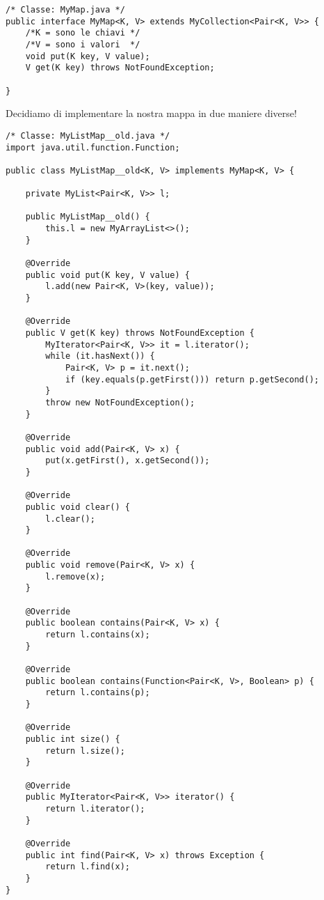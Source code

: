 \begin{lstlisting}[basicstyle=\small,]
/* Classe: MyMap.java */
public interface MyMap<K, V> extends MyCollection<Pair<K, V>> {
	/*K = sono le chiavi */
	/*V = sono i valori  */
    void put(K key, V value);
    V get(K key) throws NotFoundException;

}
\end{lstlisting}

\noindent Decidiamo di implementare la nostra mappa in due maniere diverse! 

\begin{lstlisting}[basicstyle=\small,]
/* Classe: MyListMap__old.java */
import java.util.function.Function;

public class MyListMap__old<K, V> implements MyMap<K, V> {

    private MyList<Pair<K, V>> l;

    public MyListMap__old() {
        this.l = new MyArrayList<>();
    }

    @Override
    public void put(K key, V value) {
        l.add(new Pair<K, V>(key, value));
    }

    @Override
    public V get(K key) throws NotFoundException {
        MyIterator<Pair<K, V>> it = l.iterator();
        while (it.hasNext()) {
            Pair<K, V> p = it.next();
            if (key.equals(p.getFirst())) return p.getSecond();
        }
        throw new NotFoundException();
    }

    @Override
    public void add(Pair<K, V> x) {
        put(x.getFirst(), x.getSecond());
    }

    @Override
    public void clear() {
        l.clear();
    }

    @Override
    public void remove(Pair<K, V> x) {
        l.remove(x);
    }

    @Override
    public boolean contains(Pair<K, V> x) {
        return l.contains(x);
    }

    @Override
    public boolean contains(Function<Pair<K, V>, Boolean> p) {
        return l.contains(p);
    }

    @Override
    public int size() {
        return l.size();
    }

    @Override
    public MyIterator<Pair<K, V>> iterator() {
        return l.iterator();
    }

    @Override
    public int find(Pair<K, V> x) throws Exception {
        return l.find(x);
    }
}
\end{lstlisting}

